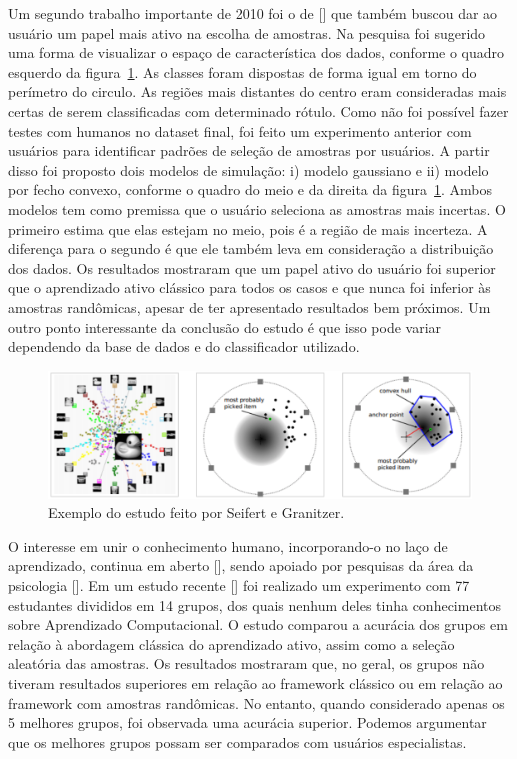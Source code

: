 
Um segundo trabalho importante de 2010 foi o de [\cite{seifert2010user}] que também buscou dar ao usuário um papel mais ativo na escolha de amostras. Na pesquisa foi sugerido uma forma de visualizar o espaço de característica dos dados, conforme o quadro esquerdo da figura~\ref{fig:seifert_example}. As classes foram dispostas de forma igual em torno do perímetro do circulo. As regiões mais distantes do centro eram consideradas mais certas de serem classificadas com determinado rótulo. Como não foi possível fazer testes com humanos no dataset final, foi feito um experimento anterior com usuários para identificar padrões de seleção de amostras por usuários. A partir disso foi proposto dois modelos de simulação: i) modelo gaussiano e ii) modelo por fecho convexo, conforme o quadro do meio e da direita da figura~\ref{fig:seifert_example}. Ambos modelos tem como premissa que o usuário seleciona as amostras mais incertas. O primeiro estima que elas estejam no meio, pois é a região de mais incerteza. A diferença para o segundo é que ele também leva em consideração a distribuição dos dados. Os resultados mostraram que um papel ativo do usuário foi superior que o aprendizado ativo clássico para todos os casos e que nunca foi inferior às amostras randômicas, apesar de ter apresentado resultados bem próximos. Um outro ponto interessante da conclusão do estudo é que isso pode variar dependendo da base de dados e do classificador utilizado.

\begin{figure}
  \centering
  \includegraphics[width=1.0\textwidth]{figures/seifert_example.png}
  \caption{Exemplo do estudo feito por Seifert e Granitzer.}
  \label{fig:seifert_example}
\end{figure}

O interesse em unir o conhecimento humano, incorporando-o no laço de aprendizado, continua em aberto [\cite{calma2016active}], sendo apoiado por pesquisas da área da psicologia [\cite{sim2015children}]. Em um estudo recente [\cite{kottke2018other}] foi realizado um experimento com 77 estudantes divididos em 14 grupos, dos quais nenhum deles tinha conhecimentos sobre Aprendizado Computacional. O estudo comparou a acurácia dos grupos em relação à abordagem clássica do aprendizado ativo, assim como a seleção aleatória das amostras. Os resultados mostraram que, no geral, os grupos não tiveram resultados superiores em relação ao framework clássico ou em relação ao framework com amostras randômicas. No entanto, quando considerado apenas os 5 melhores grupos, foi observada uma acurácia superior. Podemos argumentar que os melhores grupos possam ser comparados com usuários especialistas. 

